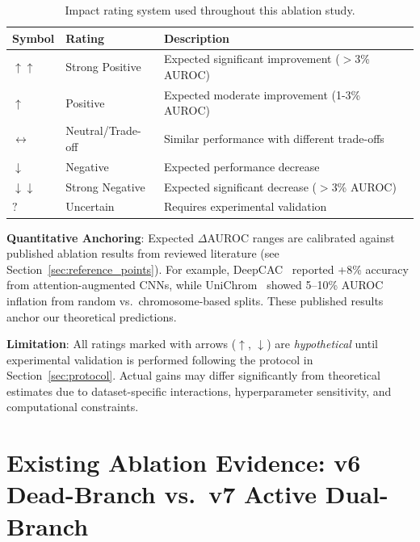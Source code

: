 \documentclass[11pt,a4paper]{article}
\begin{document}
\begin{table}[H]
\centering
\begin{tabular}{lll}
\toprule
\textbf{Symbol} & \textbf{Rating} & \textbf{Description} \\
\midrule
\textcolor{positive}{$\uparrow\uparrow$} & Strong Positive & Expected significant improvement ($>$3\% AUROC) \\
\textcolor{positive}{$\uparrow$} & Positive & Expected moderate improvement (1-3\% AUROC) \\
\textcolor{neutral}{$\leftrightarrow$} & Neutral/Trade-off & Similar performance with different trade-offs \\
\textcolor{negative}{$\downarrow$} & Negative & Expected performance decrease \\
\textcolor{negative}{$\downarrow\downarrow$} & Strong Negative & Expected significant decrease ($>$3\% AUROC) \\
\textcolor{uncertain}{$?$} & Uncertain & Requires experimental validation \\
\bottomrule
\end{tabular}
\caption{Impact rating system used throughout this ablation study.}
\end{table}

\textbf{Quantitative Anchoring}: Expected $\Delta$AUROC ranges are calibrated against published ablation results from reviewed literature (see Section~\ref{sec:reference_points}). For example, DeepCAC~\cite{deepcac} reported +8\% accuracy from attention-augmented CNNs, while UniChrom~\cite{unichrom} showed 5--10\% AUROC inflation from random vs.\ chromosome-based splits. These published results anchor our theoretical predictions.

\textbf{Limitation}: All ratings marked with arrows ($\uparrow$, $\downarrow$) are \textit{hypothetical} until experimental validation is performed following the protocol in Section~\ref{sec:protocol}. Actual gains may differ significantly from theoretical estimates due to dataset-specific interactions, hyperparameter sensitivity, and computational constraints.

\section{Existing Ablation Evidence: v6 Dead-Branch vs.\ v7 Active Dual-Branch}
\label{sec:existing_evidence}
\end{document}

